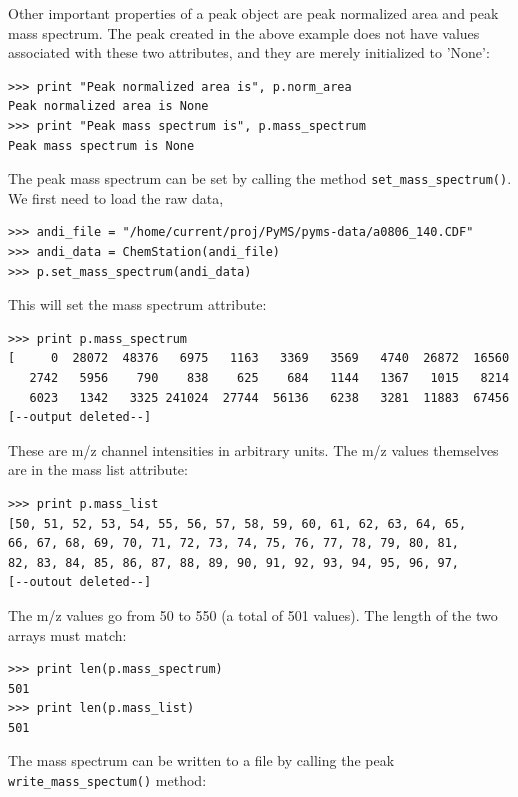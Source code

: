 \noindent
Other important properties of a peak object are peak normalized area
and peak mass spectrum. The peak created in the above example does
not have values associated with these two attributes, and they are
merely initialized to 'None':

\begin{verbatim}
>>> print "Peak normalized area is", p.norm_area
Peak normalized area is None
>>> print "Peak mass spectrum is", p.mass_spectrum
Peak mass spectrum is None
\end{verbatim}

\noindent
The peak mass spectrum can be set by calling the method {\tt set\_mass\_spectrum()}.
We first need to load the raw data,

\begin{verbatim}
>>> andi_file = "/home/current/proj/PyMS/pyms-data/a0806_140.CDF"
>>> andi_data = ChemStation(andi_file)
>>> p.set_mass_spectrum(andi_data)
\end{verbatim}

\noindent
This will set the mass spectrum attribute: 

\begin{verbatim}
>>> print p.mass_spectrum
[     0  28072  48376   6975   1163   3369   3569   4740  26872  16560
   2742   5956    790    838    625    684   1144   1367   1015   8214
   6023   1342   3325 241024  27744  56136   6238   3281  11883  67456
[--output deleted--]
\end{verbatim}

\noindent
These are m/z channel intensities in arbitrary units. The m/z values
themselves are in the mass list attribute:

\begin{verbatim}
>>> print p.mass_list
[50, 51, 52, 53, 54, 55, 56, 57, 58, 59, 60, 61, 62, 63, 64, 65,
66, 67, 68, 69, 70, 71, 72, 73, 74, 75, 76, 77, 78, 79, 80, 81,
82, 83, 84, 85, 86, 87, 88, 89, 90, 91, 92, 93, 94, 95, 96, 97,
[--outout deleted--]
\end{verbatim}

\noindent
The m/z values go from 50 to 550 (a total of 501 values).  The length of
the two arrays must match:

\begin{verbatim}
>>> print len(p.mass_spectrum)
501
>>> print len(p.mass_list)
501
\end{verbatim}

The mass spectrum can be written to a file by calling the peak
{\tt write\_mass\_spectum()} method:

